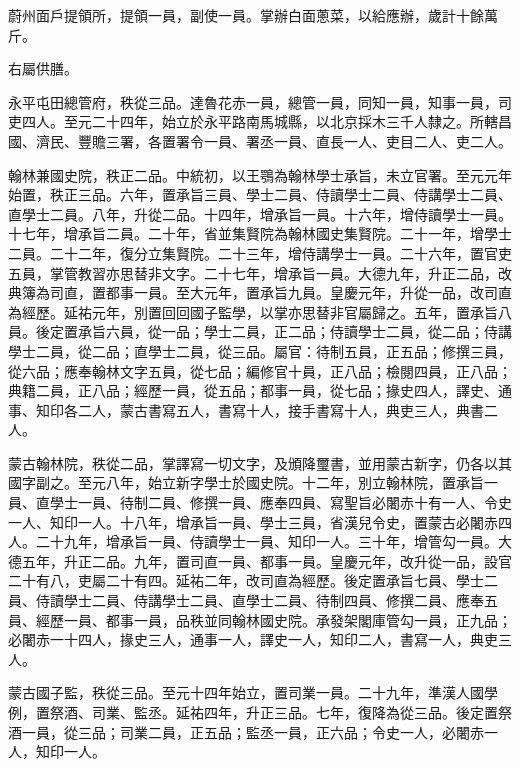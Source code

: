 \begin{pinyinscope}
 蔚州面戶提領所，提領一員，副使一員。掌辦白面蔥菜，以給應辦，歲計十餘萬斤。



 右屬供膳。



 永平屯田總管府，秩從三品。達魯花赤一員，總管一員，同知一員，知事一員，司吏四人。至元二十四年，始立於永平路南馬城縣，以北京採木三千人隸之。所轄昌國、濟民、豐贍三署，各置署令一員、署丞一員、直長一人、吏目二人、吏二人。



 翰林兼國史院，秩正二品。中統初，以王鶚為翰林學士承旨，未立官署。至元元年始置，秩正三品。六年，置承旨三員、學士二員、侍讀學士二員、侍講學士二員、直學士二員。八年，升從二品。十四年，增承旨一員。十六年，增侍讀學士一員。十七年，增承旨二員。二十年，省並集賢院為翰林國史集賢院。二十一年，增學士二員。二十二年，復分立集賢院。二十三年，增侍講學士一員。二十六年，置官吏五員，掌管教習亦思替非文字。二十七年，增承旨一員。大德九年，升正二品，改典簿為司直，置都事一員。至大元年，置承旨九員。皇慶元年，升從一品，改司直為經歷。延祐元年，別置回回國子監學，以掌亦思替非官屬歸之。五年，置承旨八員。後定置承旨六員，從一品；學士二員，正二品；侍讀學士二員，從二品；侍講學士二員，從二品；直學士二員，從三品。屬官：待制五員，正五品；修撰三員，從六品；應奉翰林文字五員，從七品；編修官十員，正八品；檢閱四員，正八品；典籍二員，正八品；經歷一員，從五品；都事一員，從七品；掾史四人，譯史、通事、知印各二人，蒙古書寫五人，書寫十人，接手書寫十人，典吏三人，典書二人。



 蒙古翰林院，秩從二品，掌譯寫一切文字，及頒降璽書，並用蒙古新字，仍各以其國字副之。至元八年，始立新字學士於國史院。十二年，別立翰林院，置承旨一員、直學士一員、待制二員、修撰一員、應奉四員、寫聖旨必闍赤十有一人、令史一人、知印一人。十八年，增承旨一員、學士三員，省漢兒令史，置蒙古必闍赤四人。二十九年，增承旨一員、侍讀學士一員、知印一人。三十年，增管勾一員。大德五年，升正二品。九年，置司直一員、都事一員。皇慶元年，改升從一品，設官二十有八，吏屬二十有四。延祐二年，改司直為經歷。後定置承旨七員、學士二員、侍讀學士二員、侍講學士二員、直學士二員、待制四員、修撰二員、應奉五員、經歷一員、都事一員，品秩並同翰林國史院。承發架閣庫管勾一員，正九品；必闍赤一十四人，掾史三人，通事一人，譯史一人，知印二人，書寫一人，典吏三人。



 蒙古國子監，秩從三品。至元十四年始立，置司業一員。二十九年，準漢人國學例，置祭酒、司業、監丞。延祐四年，升正三品。七年，復降為從三品。後定置祭酒一員，從三品；司業二員，正五品；監丞一員，正六品；令史一人，必闍赤一人，知印一人。




\end{pinyinscope}
